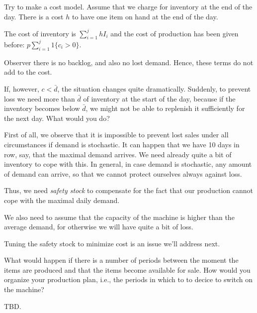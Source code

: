 \begin{question}
  Try to make a cost model. Assume that we charge for inventory at the
  end of the day.  There is a cost $h$ to have one item on hand at the
  end of the day.
  \begin{solution}
    The cost of inventory is $\sum_{i=1}^j h I_{i}$ and the cost of
    production has been given before: $p\sum_{i=1}^j 1\{c_i>0\}$.

    Observer there is no backlog, and also no lost demand. Hence,
    these terms do not add to the cost.
  \end{solution}
\end{question}

\begin{question}
  If, however, $c< \bar d$, the situation changes quite
  dramatically. Suddenly, to prevent loss we need more than $\bar d$
  of inventory at the start of the day, because if the inventory
  becomes below $\bar d$, we might not be able to replenish it
  sufficiently for the next day. What would you do?
  \begin{solution}
    First of all, we observe that it is impossible to prevent lost
    sales under all circumstances if demand is stochastic. It can
    happen that we have 10 days in row, say, that the maximal demand
    arrives. We need already quite a bit of inventory to cope with
    this. In general, in case demand is stochastic, any amount of
    demand can arrive, so that we cannot protect ourselves always
    against loss. 

    Thus, we need \emph{safety stock} to compensate for the fact that
    our production cannot cope with the maximal daily demand.

    We also need to assume that the capacity of the machine is higher
    than the average demand, for otherwise we will have quite a bit of
    loss. 

    Tuning the safety stock to minimize cost is an issue we'll address
    next. 


  \end{solution}
\end{question}

\begin{question}
  What would happen if there is a number of periods between the moment
  the items are produced and that the items become available for
  sale.  How would you organize your production plan, i.e., the periods in which to to decice to switch on the machine? 
  \begin{solution}
    TBD.
  \end{solution}
\end{question}

